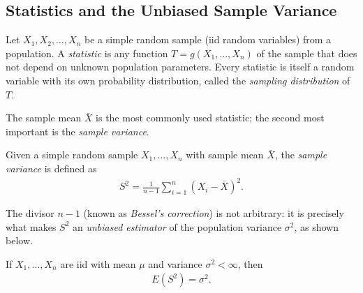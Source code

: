 \subsection{Statistics and the Unbiased Sample Variance}

\begin{definicion}[Statistic]
Let $X_1, X_2, \ldots, X_n$ be a simple random sample (iid random variables) from a population. A \emph{statistic} is any function $T = g(X_1, \ldots, X_n)$ of the sample that does not depend on unknown population parameters. Every statistic is itself a random variable with its own probability distribution, called the \emph{sampling distribution} of $T$.
\end{definicion}

The sample mean $\bar{X}$ is the most commonly used statistic; the second most important is the \emph{sample variance}.

\begin{definicion}
 \label{eq:5.1.1}
Given a simple random sample $X_1, \ldots, X_n$ with sample mean $\bar{X}$, the \emph{sample variance} is defined as
\begin{align}
 S^2 = \frac{1}{n-1}\sum_{i=1}^n (X_i - \bar{X})^2.
\end{align}
\end{definicion}

\begin{observacion}
The divisor $n-1$ (known as \emph{Bessel's correction}) is not arbitrary: it is precisely what makes $S^2$ an \emph{unbiased estimator} of the population variance $\sigma^2$, as shown below.
\end{observacion}

\begin{teorema}
 \label{eq:5.1.2}
If $X_1, \ldots, X_n$ are iid with mean $\mu$ and variance $\sigma^2 < \infty$, then
\begin{align}
 E(S^2) = \sigma^2.
\end{align}
\end{teorema}

